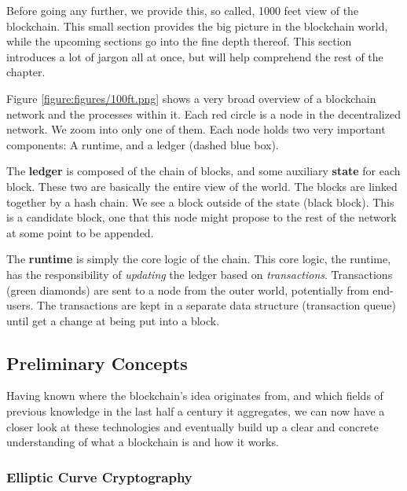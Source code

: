 Before going any further, we provide this, so called, 1000 feet view of the blockchain. This small
section provides the big picture in the blockchain world, while the upcoming sections go into the
fine depth thereof. This section introduces a lot of jargon all at once, but will help comprehend
the rest of the chapter.

Figure \ref{figure:figures/100ft.png} shows a very broad overview of a blockchain network and the
processes within it. Each red circle is a node in the decentralized network. We zoom into only one
of them. Each node holds two very important components: A runtime, and a ledger (dashed blue box).

The \textbf{ledger} is composed of the chain of blocks, and some auxiliary \textbf{state} for each
block. These two are basically the entire view of the world. The blocks are linked together by a
hash chain. We see a block outside of the state (black block). This is a candidate block, one that
this node might propose to the rest of the network at some point to be appended.

The \textbf{runtime} is simply the core logic of the chain. This core logic, the runtime, has the
responsibility of \textit{updating} the ledger based on \textit{transactions}. Transactions (green
diamonds) are sent to a node from the outer world, potentially from end-users. The transactions are
kept in a separate data structure (transaction queue) until get a change at being put into a block.

\subsection{Preliminary Concepts} \label{chap_bg:sec:preliminary}

Having known where the blockchain's idea originates from, and which fields of previous knowledge in
the last half a century it aggregates, we can now have a closer look at these technologies and
eventually build up a clear and concrete understanding of what a blockchain is and how it works.

\subsubsection{Elliptic Curve Cryptography} \label{chap_bg:subsec:ecc}

